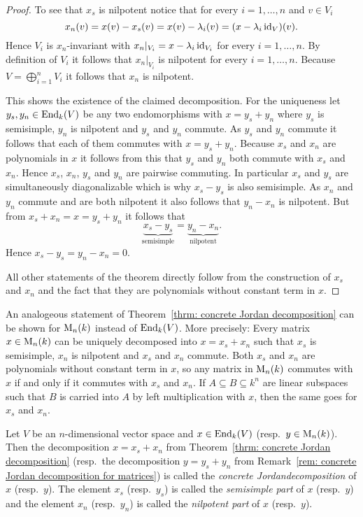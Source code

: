 \begin{proof}
 To see that $x_s$ is nilpotent notice that for every $i = 1, \dotsc, n$ and $v \in V_i$
 \[
  x_n(v) = x(v) - x_s(v) = x(v) - \lambda_i (v) = (x - \lambda_i \operatorname{id}_V)(v).
 \]
 Hence $V_i$ is $x_n$-invariant with $x_n|_{V_i} = x - \lambda_i \operatorname{id}_{V_i}$ for every $i = 1, \dotsc, n$. By definition of $V_i$ it follows that $x_n|_{V_i}$ is nilpotent for every $i = 1, \dotsc, n$. Because $V = \bigoplus_{i=1}^n V_i$ it follows that $x_n$ is nilpotent.
 
 This shows the existence of the claimed decomposition. For the uniqueness let $y_s, y_n \in \operatorname{End}_k(V)$ be any two endomorphisms with $x = y_s + y_n$ where $y_s$ is semisimple, $y_n$ is nilpotent and $y_s$ and $y_n$ commute. As $y_s$ and $y_n$ commute it follows that each of them commutes with $x = y_s + y_n$. Because $x_s$ and $x_n$ are polynomials in $x$ it follows from this that $y_s$ and $y_n$ both commute with $x_s$ and $x_n$. Hence $x_s$, $x_n$, $y_s$ and $y_n$ are pairwise commuting. In particular $x_s$ and $y_s$ are simultaneously diagonalizable which is why $x_s - y_s$ is also semisimple. As $x_n$ and $y_n$ commute and are both nilpotent it also follows that $y_n - x_n$ is nilpotent. But from $x_s + x_n = x = y_s + y_n$ it follows that
 \[
  \underbrace{x_s - y_s}_{\text{semisimple}} = \underbrace{y_n - x_n}_{\text{nilpotent}}.
 \]
 Hence $x_s - y_s = y_n - x_n = 0$.
 
 All other statements of the theorem directly follow from the construction of $x_s$ and $x_n$ and the fact that they are polynomials without constant term in $x$.
\end{proof}


\begin{rem}\label{rem: concrete Jordan decomposition for matrices}
 An analogeous statement of Theorem~\ref{thrm: concrete Jordan decomposition} can be shown for $\operatorname{M}_n(k)$ instead of $\operatorname{End}_k(V)$. More precisely: Every matrix $x \in \operatorname{M}_n(k)$ can be uniquely decomposed into $x = x_s + x_n$ such that $x_s$ is semisimple, $x_n$ is nilpotent and $x_s$ and $x_n$ commute. Both $x_s$ and $x_n$ are polynomials without constant term in $x$, so any matrix in $\operatorname{M}_n(k)$ commutes with $x$ if and only if it commutes with $x_s$ and $x_n$. If $A \subseteq B \subseteq k^n$ are linear subspaces such that $B$ is carried into $A$ by left multiplication with $x$, then the same goes for $x_s$ and $x_n$.
\end{rem}


\begin{defi}
 Let $V$ be an $n$-dimensional vector space and $x \in \operatorname{End}_k(V)$ (resp.\ $y \in \operatorname{M}_n(k)$). Then the decomposition $x = x_s + x_n$ from Theorem~\ref{thrm: concrete Jordan decomposition} (resp.\ the decomposition $y = y_s + y_n$ from Remark~\ref{rem: concrete Jordan decomposition for matrices}) is called the \emph{concrete Jordandecomposition} of $x$ (resp.\ $y$). The element $x_s$ (resp.\ $y_s$) is called the \emph{semisimple part} of $x$ (resp.\ $y$) and the element $x_n$ (resp.\ $y_n$) is called the \emph{nilpotent part} of $x$ (resp.\ $y$).
\end{defi}


